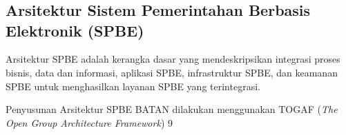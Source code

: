 \chapter{\babSatu}
\section{Arsitektur Sistem Pemerintahan Berbasis Elektronik (SPBE)}
Arsitektur SPBE adalah kerangka dasar yang mendeskripsikan integrasi proses bisnis, data dan informasi, aplikasi SPBE, infrastruktur SPBE, dan keamanan SPBE untuk menghasilkan layanan SPBE yang terintegrasi.

Penyusunan Arsitektur SPBE BATAN dilakukan menggunakan TOGAF (\textit{The Open Group Architecture Framework}) 9 \cite{HAGHIGHATHOSEINI201888} 

